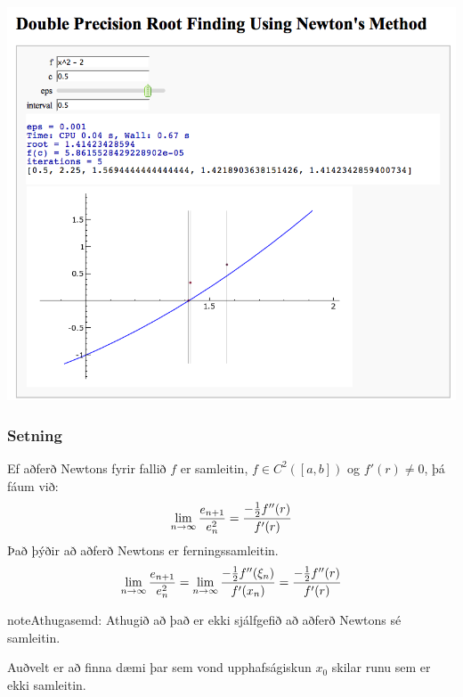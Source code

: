\documentclass[a4paper,10pt,icelandic]{sphinxmanual}
\begin{document}
\begin{center}
\includegraphics[width=8 cm,keepaspectratio=true]{newton.png}

\end{center}

\subsubsection{Setning}
\label{kafli02:id7}
Ef aðferð Newtons fyrir fallið \(f\) er samleitin,
\(f\in C^2([a,b])\) og \(f'(r)\neq 0\), þá fáum við:
\begin{gather}
\begin{split}\lim_{n\to \infty}\dfrac{e_{n+1}}{e_n^2}=\frac{-\frac{1}{2}f''(r)}
        {f'(r)}\end{split}\notag
\end{gather}
Það þýðir að aðferð Newtons er ferningssamleitin.
\begin{gather}
\begin{split}\lim_{n\to \infty}\dfrac{e_{n+1}}{e_n^2}=
\lim_{n\to \infty}\frac{-\frac{1}{2}f''(\xi_n)}{f'(x_n)} =
\frac{-\frac{1}{2}f''(r)}{f'(r)}\end{split}\notag
\end{gather}
\begin{notice}{note}{Athugasemd:}
Athugið að það er ekki sjálfgefið að aðferð Newtons sé samleitin.

Auðvelt er að finna dæmi þar sem vond upphafságiskun \(x_0\) skilar
runu sem er ekki samleitin.
\end{notice}
\end{document}
